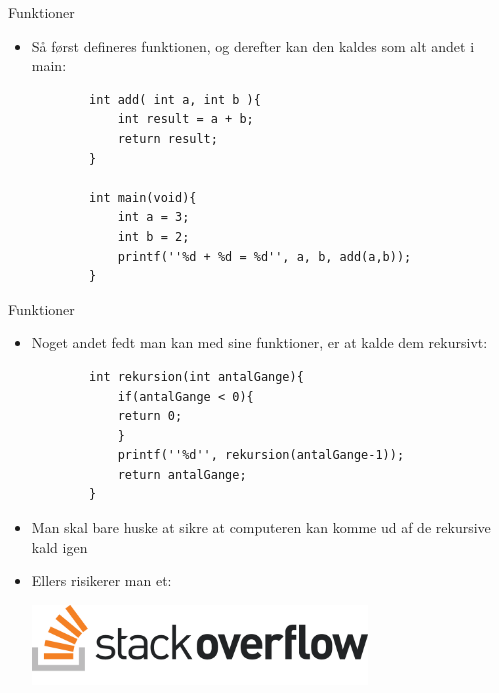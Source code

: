 \documentclass{beamer}
\begin{document}

\begin{frame}[fragile]{Funktioner}
	\begin{itemize}
		\item{Så først defineres funktionen, og derefter  kan den kaldes som alt andet i main:}
		\begin{lstlisting}
		int add( int a, int b ){
			int result = a + b;
			return result;
		}

		int main(void){
			int a = 3;
			int b = 2;
			printf(''%d + %d = %d'', a, b, add(a,b));
		}
		\end{lstlisting}
	\end{itemize}
\end{frame}


\begin{frame}[fragile]{Funktioner}
	\begin{itemize}
		\item{Noget andet fedt man kan med sine funktioner, er at kalde dem rekursivt:}
		\begin{lstlisting}
		int rekursion(int antalGange){
			if(antalGange < 0){
			return 0;
			}
			printf(''%d'', rekursion(antalGange-1));
			return antalGange;
		}
		\end{lstlisting}
		\item{Man skal bare huske at sikre at computeren kan komme ud af de rekursive kald igen}
		\item{Ellers risikerer man et:}
		\begin{center}
		\includegraphics[width=0.7\textwidth]{assets/so-logo.png}
	\end{center}
	\end{itemize}
\end{frame}

\end{document}
